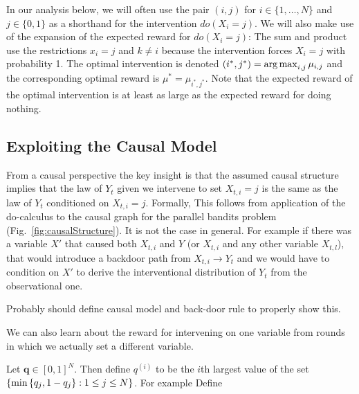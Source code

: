 In our analysis below, we will often use the pair $(i,j)$ for $i \in \{1, \ldots, N\}$ and $j \in \{0,1\}$ as a shorthand for the intervention $do(X_i = j)$.
We will also make use of the expansion of the expected reward for $do(X_i = j)$:
The sum and product use the restrictions $x_i = j$ and $k \ne i$ because the intervention forces $X_i = j$ with probability 1.
The optimal intervention is denoted $(i^*,j^*) = \argmax_{i,j} \mu_{i,j}$ and the corresponding optimal reward is $\mu^* = \mu_{i^*,j^*}$. 
Note that the expected reward of the optimal intervention is at least as large as the expected reward for doing nothing.



\subsection{Exploiting the Causal Model}

From a causal perspective the key insight is that the assumed causal structure implies that
the law of $Y_t$ given we intervene to set $X_{t,i} = j$ is the same as the law of $Y_t$ conditioned
on $X_{t,i} = j$. Formally,
This follows from application of the do-calculus \cite{Pearl2000} to the causal graph for the parallel bandits problem (Fig.~\ref{fig:causalStructure}). It is not the case in general. 
For example if there was a variable $X'$ that caused both $X_{t,i}$ and $Y$ (or $X_{t,i}$ and any other variable $X_{t,l}$), 
that would introduce a backdoor path from $X_{t,i} \rightarrow Y_t$ and we would have to condition on $X'$ to derive the 
interventional distribution of $Y_t$ from the observational one.

\color{red} Probably should define causal model and back-door rule to properly show this.\color{black}

We can also learn about the reward for intervening on one variable from rounds in which we actually set a different variable.



\begin{definition}
Let $\boldsymbol{q} \in [0,1]^N$. Then define $q^{(i)}$ to be the $i$th largest value of the set $\left\{\min \left\{q_j, 1 - q_j\right\} : 1 \leq j \leq N\right\}$.
For example
Define 
\end{definition}
